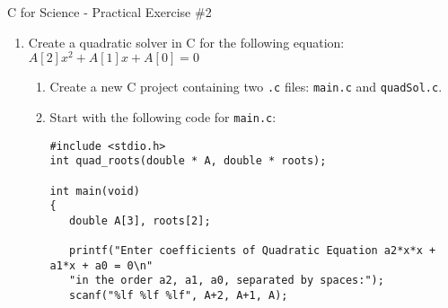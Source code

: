 \documentclass[a4paper,12pt]{article}
\begin{document}
\begin{center}
\large C for Science - Practical Exercise \#2
\end{center}

\begin{enumerate}
\item Create a quadratic solver in C for the following equation:
$ A[2]x^2 + A[1]x + A[0] = 0$
\begin{enumerate}
\item Create a new C project containing two \texttt{.c} files: \texttt{main.c} and \texttt{quadSol.c}.
\item Start with the following code for \texttt{main.c}:
\begin{scriptsize}
\begin{verbatim}
#include <stdio.h>
int quad_roots(double * A, double * roots);

int main(void)
{
   double A[3], roots[2];

   printf("Enter coefficients of Quadratic Equation a2*x*x + a1*x + a0 = 0\n"
   "in the order a2, a1, a0, separated by spaces:");
   scanf("%lf %lf %lf", A+2, A+1, A);


\end{verbatim}
\end{scriptsize}
\end{enumerate}
\end{enumerate}
\end{document}
